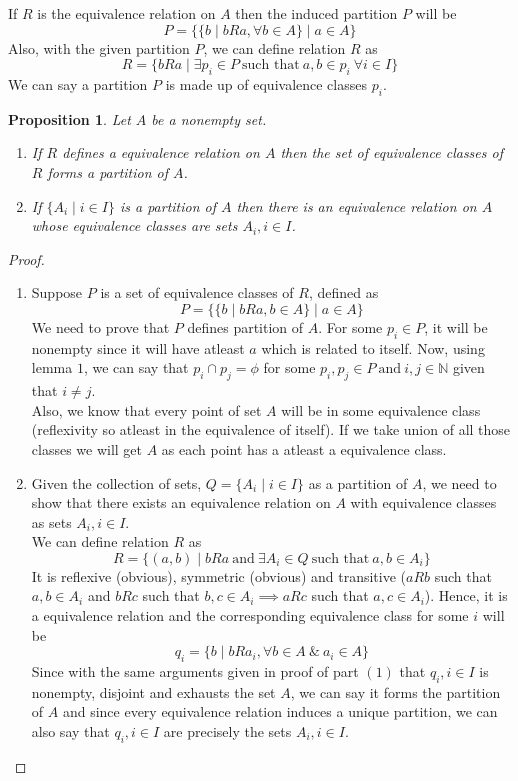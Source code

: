 \documentclass[12pt]{report}
\newtheorem{prop}{Proposition}
\begin{document}
If $R$ is the equivalence relation on $A$ then the induced partition $P$ will be $$ P = \{\{b \mid bRa, \forall b \in A\} \mid a \in A\}$$
Also, with the given partition $P$, we can define relation $R$ as $$ R = \{bRa \mid \exists p_i \in P ~\text{such that}~ a, b \in p_i ~\forall i \in I\}$$
We can say a partition $P$ is made up of equivalence classes $p_i$.
\begin{prop}
    Let $A$ be a nonempty set.
    \begin{enumerate}
        \item If $R$ defines a equivalence relation on $A$ then the set of equivalence classes of $R$ forms a partition of $A$. 
        \item If $\{A_i \mid i \in I\}$ is a partition of $A$ then there is an equivalence relation on $A$ whose equivalence classes are sets $A_i, i \in I$. 
    \end{enumerate}
\end{prop}
\begin{proof}
    \begin{enumerate}
        \item Suppose $P$ is a set of equivalence classes of $R$, defined as $$ P = \{\{b \mid bRa, b \in A\} \mid a \in  A\}$$ We need to prove that $P$ defines partition of $A$. For some $p_i \in P$, it will be nonempty since it will have atleast $a$ which is related to itself. Now, using lemma $1$, we can say that $p_i \cap p_j = \phi$ for some $p_i,p_j \in P~\text{and}~ i,j \in \mathbb{N}$ given that $i \neq j$. \\
        Also, we know that every point of set $A$ will be in some equivalence class (reflexivity so atleast in the equivalence of itself). If we take union of all those classes we will get $A$ as each point has a atleast a equivalence class.
        \item Given the collection of sets, $Q = \{A_i \mid i \in I\}$ as a partition of $A$, we need to show that there exists an equivalence relation on $A$ with equivalence classes as sets $A_i, i \in I$.\\
        We can define relation $R$ as
        $$ R = \{(a,b) \mid bRa~\text{and}~\exists A_i \in Q~\text{such that}~a,b \in A_i\}$$
        It is reflexive (obvious), symmetric (obvious) and transitive ($aRb$ such that $a,b \in A_i$ and $bRc$ such that $b,c \in A_i \implies aRc$ such that $a,c \in A_i$). Hence, it is a equivalence relation and the corresponding equivalence class for some $i$ will be 
        $$ q_i = \{b \mid bRa_i, \forall b \in A~ \&~ a_i \in A\}$$ 
        Since with the same arguments given in proof of part $(1)$ that $q_i, i \in I$ is nonempty, disjoint and exhausts the set $A$, we can say it forms the partition of $A$ and since every equivalence relation induces a unique partition, we can also say that $q_i, i \in I$ are precisely the sets $A_i, i \in I$.
    \end{enumerate}
\end{proof}
\end{document}
